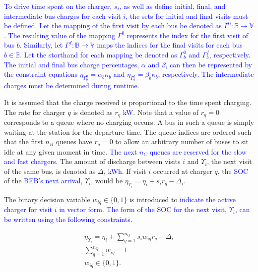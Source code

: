 \documentclass[utf8]{FrontiersinHarvard}
\begin{document}
\textcolor{blue}{To drive time spent on the charger, $s_i$, as well as define initial, final, and intermediate bus
  charges for each visit $i$, the sets for initial and final visits must be defined. Let the mapping of the first visit
  by each bus be denoted as $\Gamma^0 : \mathbb{B} \rightarrow \mathbb{V}$. The resulting value of the mapping
  $\Gamma^0$ represents the index for the first visit of bus $b$. Similarly, let $\Gamma^f : \mathbb{B} \rightarrow
  \mathbb{V}$ maps the indices for the final visits for each bus $b \in \mathbb{B}$. Let the storthand for each mapping
  be denoted as $\Gamma^0_b$ and $\Gamma^f_b$, respectively. The initial and final bus charge percentages, $\alpha$ and
  $\beta$, can then be represented by the constraint equations $\eta_{\Gamma^0_b} = \alpha_b \kappa_{b}$ and
  $\eta_{\Gamma^f_b} = \beta_b \kappa_{b}$, respectively. The intermediate charges must be determined during runtime.}

It is assumed that the charge received is proportional to the time spent charging. The rate for charger \(q\) is denoted
as \(r_q\) \textcolor{blue}{kW}. Note that a value of \(r_q = 0\) corresponds to a queue where no charging
occurs. A bus in such a queue is simply waiting at the station for the departure time. The queue indices are ordered
such that the first \(n_B\) queues have \(r_q = 0\) to allow an arbitrary number of buses to sit idle at any given moment in
time. \textcolor{blue}{The next $n_C$ queues are reserved for the slow and fast chargers.} The amount of
discharge between visits \(i\) and \(\Upsilon_i\), the next visit of the same bus, is denoted as \(\Delta_i\)
\textcolor{blue}{kWh}. If visit \(i\) occurred at charger \(q\), the \textcolor{blue}{SOC} of the
\textcolor{blue}{BEB's next arrival}, \(\Upsilon_i\), would be \(\eta_{\Upsilon_i} = \eta_i + s_i r_q - \Delta_i\).

The binary decision variable \(w_{iq} \in \{0,1\}\) is introduced to \textcolor{blue}{indicate the active charger for visit $i$ in vector form. The form of the SOC for the next visit, $\Upsilon_i$, can be written using the following constraints.}

\begin{subequations}
    \label{subeq:pre_next_charge}
\begin{align}
    \eta_{\Upsilon_i} = \eta_i + \sum_{q=1}^{n_Q} s_i w_{iq} r_q - \Delta_i \\
    \sum_{q=1}^{n_Q} w_{iq} = 1                           \\
    w_{iq} \in \{0,1\}.
\end{align}
\end{subequations}
\end{document}
